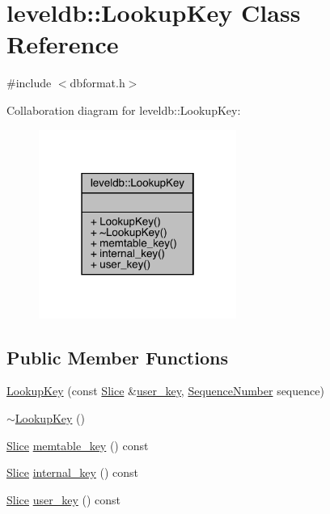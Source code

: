 \hypertarget{classleveldb_1_1_lookup_key}{}\section{leveldb\+::Lookup\+Key Class Reference}
\label{classleveldb_1_1_lookup_key}


{\ttfamily \#include $<$dbformat.\+h$>$}



Collaboration diagram for leveldb\+::Lookup\+Key\+:
\nopagebreak
\begin{figure}[H]
\begin{center}
\leavevmode
\includegraphics[width=183pt]{classleveldb_1_1_lookup_key__coll__graph}
\end{center}
\end{figure}
\subsection*{Public Member Functions}
\begin{DoxyCompactItemize}
\item 
\mbox{\hyperlink{classleveldb_1_1_lookup_key_acd09aa56607ced962e1b458d05d53472}{Lookup\+Key}} (const \mbox{\hyperlink{classleveldb_1_1_slice}{Slice}} \&\mbox{\hyperlink{classleveldb_1_1_lookup_key_a35812939729922656f6dc98c43216265}{user\+\_\+key}}, \mbox{\hyperlink{namespaceleveldb_a5481ededd221c36d652c371249f869fa}{Sequence\+Number}} sequence)
\item 
\mbox{\hyperlink{classleveldb_1_1_lookup_key_a1ed5751c159540217aa5d702fdf83a98}{$\sim$\+Lookup\+Key}} ()
\item 
\mbox{\hyperlink{classleveldb_1_1_slice}{Slice}} \mbox{\hyperlink{classleveldb_1_1_lookup_key_aa53ebf124713e32632a7aaaee359ac22}{memtable\+\_\+key}} () const
\item 
\mbox{\hyperlink{classleveldb_1_1_slice}{Slice}} \mbox{\hyperlink{classleveldb_1_1_lookup_key_a3ba069ced6c871a1f420487e8ca99fc1}{internal\+\_\+key}} () const
\item 
\mbox{\hyperlink{classleveldb_1_1_slice}{Slice}} \mbox{\hyperlink{classleveldb_1_1_lookup_key_a35812939729922656f6dc98c43216265}{user\+\_\+key}} () const
\end{DoxyCompactItemize}


